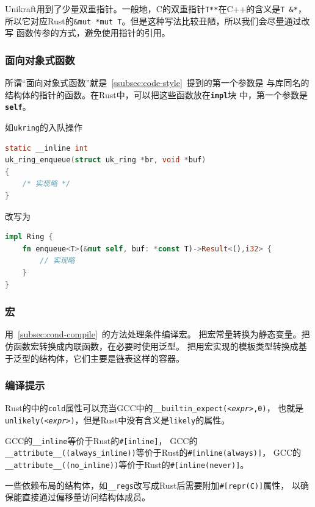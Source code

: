 \documentclass{../runikraft-report}
\begin{document}
Unikraft用到了少量双重指针。一般地，C的双重指针\texttt{T**}在C++的含义是\texttt{T \&*}，
所以它对应Rust的\texttt{\&mut *mut T}。但是这种写法比较丑陋，所以我们会尽量通过改写
函数传参的方式，避免使用指针的引用。

\subsubsection{面向对象式函数}
所谓“面向对象式函数”就是\ \ref{ssubsec:code-style}\ 提到的第一个参数是
与库同名的结构体的指针的函数。在Rust中，可以把这些函数放在\texttt{\textbf{impl}}块
中，第一个参数是\texttt{\textbf{self}}。

如\texttt{ukring}的入队操作
\begin{lstlisting}[language=C]
static __inline int
uk_ring_enqueue(struct uk_ring *br, void *buf)
{
    /* 实现略 */
}
\end{lstlisting}
改写为
\begin{lstlisting}[language=Rust]
impl Ring {
    fn enqueue<T>(&mut self, buf: *const T)->Result<(),i32> {
        // 实现略
    }
}
\end{lstlisting}

\subsubsection{宏}

用\ \ref{subsec:cond-compile}\ 的方法处理条件编译宏。
把宏常量转换为静态变量。把仿函数宏转换成内联函数，在必要时使用泛型。
把用宏实现的模板类型转换成基于泛型的结构体，它们主要是链表这样的容器。

\subsubsection{编译提示}
Rust的中的\texttt{cold}属性可以充当GCC中的\texttt{\_\_builtin\_expect(\textit{<expr>},0)}，
也就是\texttt{unlikely(\textit{<expr>})}，但是Rust中没有含义是\texttt{likely}的属性。

GCC的\texttt{\_\_inline}等价于Rust的\texttt{\#[inline]}，
GCC的\texttt{\_\_attribute\_\_((always\_inline))}等价于Rust的\texttt{\#[inline(always)]}，
GCC的\texttt{\_\_attribute\_\_((no\_inline))}等价于Rust的\texttt{\#[inline(never)]}。

一些依赖布局的结构体，如\texttt{\_\_regs}改写成Rust后需要附加\texttt{\#[repr(C)]}属性，
以确保能直接通过偏移量访问结构体成员。
\end{document}
